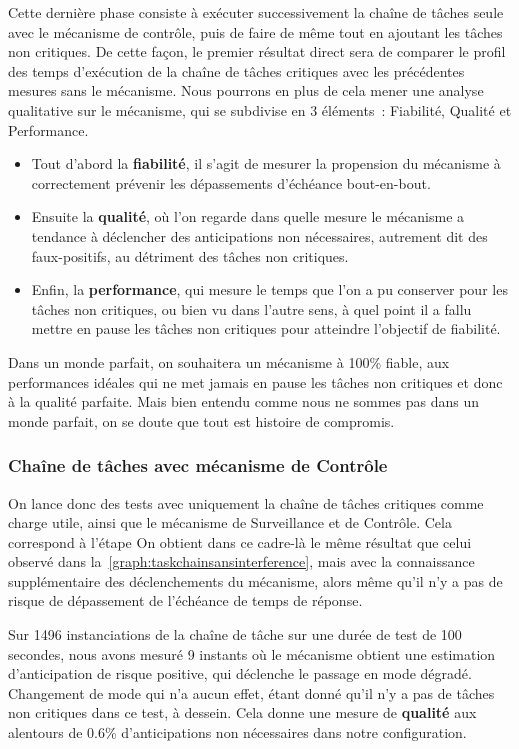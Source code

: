 \documentclass[french, a4paper, 11pt, twoside, pdftex]{StyleThese}
\begin{document}
Cette dernière phase consiste à exécuter successivement la chaîne de tâches seule avec le mécanisme de contrôle, puis de faire de même tout en ajoutant les tâches non critiques. De cette façon, le premier résultat direct sera de comparer le profil des temps d'exécution de la chaîne de tâches critiques avec les précédentes mesures sans le mécanisme. Nous pourrons en plus de cela mener une analyse qualitative sur le mécanisme, qui se subdivise en 3 éléments~: Fiabilité, Qualité et Performance.
\begin{itemize}
	\item Tout d'abord la \textbf{fiabilité}, il s'agit de mesurer la propension du mécanisme à correctement prévenir les dépassements d'échéance bout-en-bout. 
	\item Ensuite la \textbf{qualité}, où l'on regarde dans quelle mesure le mécanisme a tendance à déclencher des anticipations non nécessaires, autrement dit des faux-positifs, au détriment des tâches non critiques. 
	\item Enfin, la \textbf{performance}, qui mesure le temps que l'on a pu conserver pour les tâches non critiques, ou bien vu dans l'autre sens, à quel point il a fallu mettre en pause les tâches non critiques pour atteindre l'objectif de fiabilité. 
\end{itemize}
Dans un monde parfait, on souhaitera un mécanisme à 100\% fiable, aux performances idéales qui ne met jamais en pause les tâches non critiques et donc à la qualité parfaite. Mais bien entendu comme nous ne sommes pas dans un monde parfait, on se doute que tout est histoire de compromis.


\subsubsection{Chaîne de tâches avec mécanisme de Contrôle}

On lance donc des tests avec uniquement la chaîne de tâches critiques comme charge utile, ainsi que le mécanisme de Surveillance et de Contrôle. Cela correspond à l'étape  On obtient dans ce cadre-là le même résultat que celui observé dans la~\autoref{graph:taskchainsansinterference}, mais avec la connaissance supplémentaire des déclenchements du mécanisme, alors même qu'il n'y a pas de risque de dépassement de l'échéance de temps de réponse. 

Sur 1496 instanciations de la chaîne de tâche sur une durée de test de 100 secondes, nous avons mesuré 9 instants où le mécanisme obtient une estimation d'anticipation de risque positive, qui déclenche le passage en mode dégradé. Changement de mode qui n'a aucun effet, étant donné qu'il n'y a pas de tâches non critiques dans ce test, à dessein. Cela donne une mesure de \textbf{qualité} aux alentours de 0.6\% d'anticipations non nécessaires dans notre configuration.
\end{document}
